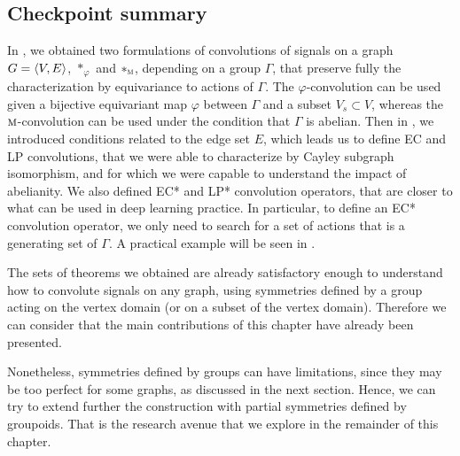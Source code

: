 \subsection{Checkpoint summary}

In , we obtained two formulations of convolutions of signals on a graph $G = \langle V, E \rangle$, $\ast_\varphi$ and $\ast_{\operatorname{\textsc{m}}}$, depending on a group $\Gamma$, that preserve fully the characterization by equivariance to actions of $\Gamma$. The $\varphi$-convolution can be used given a bijective equivariant map $\varphi$ between $\Gamma$ and a subset $V_s \subset V$, whereas the $\operatorname{\textsc{m}}$-convolution can be used under the condition that $\Gamma$ is abelian. Then in , we introduced conditions related to the edge set $E$, which leads us to define EC and LP convolutions, that we were able to characterize by Cayley subgraph isomorphism, and for which we were capable to understand the impact of abelianity. We also defined EC* and LP* convolution operators, that are closer to what can be used in deep learning practice. In particular, to define an EC* convolution operator, we only need to search for a set of actions that is a generating set of $\Gamma$. A practical example will be seen in .

The sets of theorems we obtained are already satisfactory enough to understand how to convolute signals on any graph, using symmetries defined by a group acting on the vertex domain (or on a subset of the vertex domain). Therefore we can consider that the main contributions of this chapter have already been presented.

Nonetheless, symmetries defined by groups can have limitations, since they may be too perfect for some graphs, as discussed in the next section. Hence, we can try to extend further the construction with partial symmetries defined by groupoids. That is the research avenue that we explore in the remainder of this chapter.